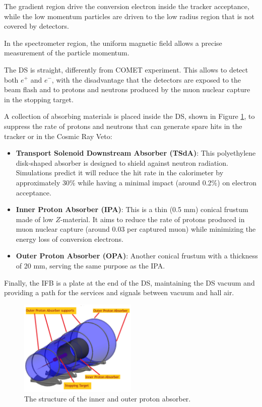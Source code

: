 The gradient region drive the conversion electron 
inside the tracker acceptance, while the low momentum particles 
are driven to the low radius region that is not covered by detectors.  

In the spectrometer region, the uniform magnetic field allows a precise 
measurement of the particle momentum. 

The DS is straight, differently from COMET experiment. This allows 
to detect both $e^+$ and $e^-$, with the disadvantage that the detectors are exposed to the 
beam flash and to protons and neutrons produced by the muon
nuclear capture in the stopping target.

A collection of absorbing materials is placed inside the DS, shown in 
Figure \ref{fig:absorbersDS}, to suppress 
the rate of protons and neutrons that can generate spare hits in the 
tracker or in the Cosmic Ray Veto:
\begin{itemize}
    \item \textbf{Transport Solenoid Downstream Absorber (TSdA)}: This 
    polyethylene disk-shaped absorber is designed to shield against neutron radiation. 
    Simulations predict it will reduce the hit rate in the calorimeter by approximately 30\% 
    while having a minimal impact (around 0.2\%) on electron acceptance.
    \item \textbf{Inner Proton Absorber (IPA)}: This is a thin (0.5 mm) conical 
    frustum made of low $Z$-material. It aims to reduce the rate of protons produced 
    in muon nuclear capture (around 0.03 per captured muon) while minimizing the 
    energy loss of conversion electrons.
    \item \textbf{Outer Proton Absorber (OPA)}: Another conical frustum with a 
    thickness of 20 mm, serving the same purpose as the IPA.
\end{itemize}


Finally, the IFB is a plate 
at the end of the DS, maintaining the DS vacuum and providing a path for the services and 
signals between vacuum and hall air.

\begin{figure}[!h]
    \centering
    \includegraphics[width =0.5\textwidth]{figures/png/Screenshot_20240706_132949.png}
    \caption{The structure of the inner and outer proton absorber.}
    \label{fig:absorbersDS}
    \end{figure}




